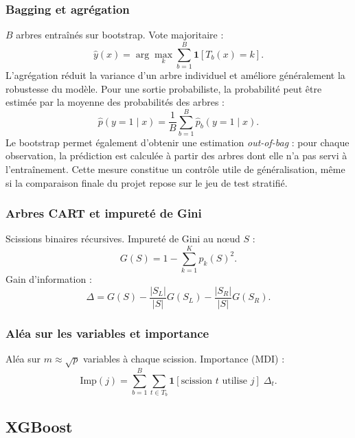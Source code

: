 \documentclass[12pt,a4paper]{report}
\begin{document}
\subsubsection{Bagging et agrégation}

$B$ arbres entraînés sur bootstrap. Vote majoritaire :
\begin{equation}
 \hat{y}(x) = \arg\max_k \sum_{b=1}^B \mathbf{1}[T_b(x) = k].
\end{equation}
L'agrégation réduit la variance d'un arbre individuel et améliore généralement la
robustesse du modèle. Pour une sortie probabiliste, la probabilité peut être estimée par
la moyenne des probabilités des arbres :
\begin{equation}
 \hat p(y=1\mid x)=\frac{1}{B}\sum_{b=1}^{B}\hat p_b(y=1\mid x).
\end{equation}
Le bootstrap permet également d'obtenir une estimation \emph{out-of-bag} : pour chaque
observation, la prédiction est calculée à partir des arbres dont elle n'a pas servi à
l'entraînement. Cette mesure constitue un contrôle utile de généralisation, même si la
comparaison finale du projet repose sur le jeu de test stratifié.

\subsubsection{Arbres CART et impureté de Gini}

Scissions binaires récursives. Impureté de Gini au nœud $S$ :
\begin{equation}
 G(S) = 1 - \sum_{k=1}^K p_k(S)^2.
\end{equation}
Gain d'information :
\begin{equation}
 \Delta = G(S) - \frac{|S_L|}{|S|}G(S_L) - \frac{|S_R|}{|S|}G(S_R).
\end{equation}

\subsubsection{Aléa sur les variables et importance}

Aléa sur $m \approx \sqrt{p}$ variables à chaque scission. Importance (MDI) :
\begin{equation}
 \text{Imp}(j) = \sum_{b=1}^B \sum_{t \in T_b}
 \mathbf{1}[\text{scission } t \text{ utilise } j] \;\Delta_t.
\end{equation}

\subsection{XGBoost}
\end{document}
